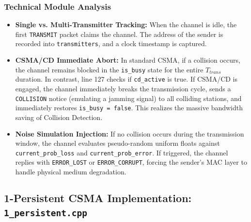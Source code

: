 \documentclass[12pt, a4paper]{article}
\begin{document}
\subsubsection{Technical Module Analysis}
\begin{itemize}
    \item \textbf{Single vs. Multi-Transmitter Tracking:} When the channel is idle, the first \texttt{TRANSMIT} packet claims the channel. The address of the sender is recorded into \texttt{transmitters}, and a clock timestamp is captured.
    \item \textbf{CSMA/CD Immediate Abort:} In standard CSMA, if a collision occurs, the channel remains blocked in the \texttt{is\_busy} state for the entire $T_{trans}$ duration. In contrast, line 127 checks if \texttt{cd\_active} is true. If CSMA/CD is engaged, the channel immediately breaks the transmission cycle, sends a \texttt{COLLISION} notice (emulating a jamming signal) to all colliding stations, and immediately restores \texttt{is\_busy = false}. This realizes the massive bandwidth saving of Collision Detection.
    \item \textbf{Noise Simulation Injection:} If no collision occurs during the transmission window, the channel evaluates pseudo-random uniform floats against \texttt{current\_prob\_loss} and \texttt{current\_prob\_error}. If triggered, the channel replies with \texttt{ERROR\_LOST} or \texttt{ERROR\_CORRUPT}, forcing the sender's MAC layer to handle physical medium degradation.
\end{itemize}

\subsection{1-Persistent CSMA Implementation: \texttt{1\_persistent.cpp}}
\end{document}
